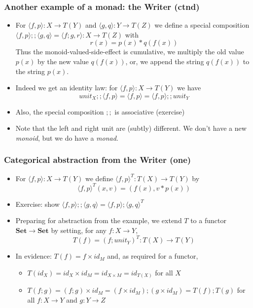 \documentclass[handout]{beamer}
\newcommand{\bfsf}[1]{{\boldsymbol{#1}}}
\newcommand{\Set}{\bfsf{Set}}
\newcommand{\Kp}[1]{{\langle #1 \rangle}}
\newcommand{\Kc}{;\!;}
\begin{document}
\frame
  {   
    \frametitle{Another example of a monad: the Writer (ctnd)}\label{Mon5:ExaSetMctnd}

 \begin{itemize}[<+->]
\item For $\Kp{f,p}: X\to T(Y)$ and $\Kp{g,q}: Y\to T(Z)$ we define a special
composition $\Kp{f,p}\Kc \Kp{g,q} = \Kp{f;g,r} : X\to T(Z)$ with $$r(x)=p(x)*q(f(x))$$
Thus the monoid-valued-side-effect is cumulative,
we multiply the old value $p(x)$ by the new value $q(f(x))$,
or, we append the string $q(f(x))$ to the string $p(x)$.
\item Indeed we get an identity law: for $\Kp{f,p}: X\to T(Y)$ we have
$$unit_X\Kc \Kp{f,p}  = \Kp{f,p} = \Kp{f,p}\Kc unit_Y$$
\item Also, the special composition $\Kc$ is associative  (exercise)
\item Note that the left and right unit are (subtly) different.
We don't have a new \emph{monoid}, but we do have a \emph{monad}.
 \end{itemize}

 }

\frame
  {   
    \frametitle{Categorical abstraction from the Writer (one)}\label{Mon5:CatAbstrOne}

 \begin{itemize}[<+->]
\item For $\Kp{f,p} : X\to T(Y)$ we define $\Kp{f,p}^T : T(X)\to T(Y)$ by
$$\Kp{f,p}^T(x,v) = (f(x),v*p(x))$$
\item Exercise: show $\Kp{f,p}\Kc\Kp{g,q} = \Kp{f,p};\Kp{g,q}^T$
\item Preparing for abstraction from the example,
we extend $T$ to a functor $\Set\to\Set$ 
by setting, for any $f:X\to Y$,  $$T(f) = (f; unit_Y)^T : T(X)\to T(Y)$$
\item In evidence: $T(f) = f\times id_M$ and, as required for a functor,
\begin{itemize}
\item
$T(id_X) = id_X \times id_M = id_{X\times M} = id_{T(X)}$  for all $X$
\item $T(f;g) = (f;g)\times id_M = (f\times id_M);(g\times id_M) = T(f); T(g)$
for all $f:X\to Y$ and $g:Y\to Z$
\end{itemize}
 \end{itemize}

 }
\end{document}
